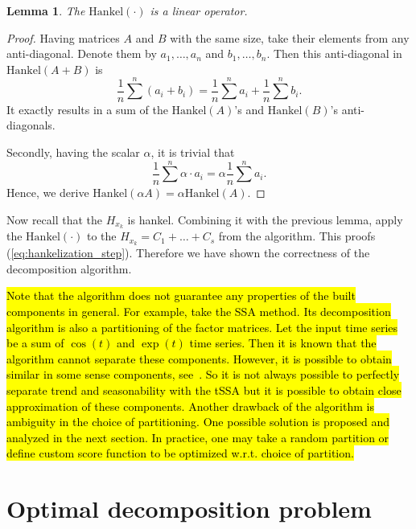 \documentclass[referee, pdflatex, sn-mathphys-num]{sn-jnl}
\theoremstyle{definition}
\theoremstyle{plain}
\newtheorem{Lem}{Lemma}
\begin{document}
	\begin{Lem}
		The $ \text{Hankel}(\cdot) $ is a linear operator.
	\end{Lem}
	
	\begin{proof}		
		Having matrices $ A $ and $ B $ with the same size, take their elements from any anti-diagonal. Denote them by $ a_1, \ldots, a_n $ and $ b_1, \ldots, b_n $. Then this anti-diagonal in $ \text{Hankel}(A + B) $ is \begin{equation*}
			 \dfrac{1}{n} \sum\limits^n (a_i + b_i) = \dfrac{1}{n} \sum\limits^n a_i + \dfrac{1}{n} \sum\limits^n b_i.
		\end{equation*}	It exactly results in a sum of the $ \text{Hankel}(A) $'s and $ \text{Hankel}(B) $'s anti-diagonals.
		
		Secondly, having the scalar $ \alpha $, it is trivial that \begin{equation*}
			 \dfrac{1}{n} \sum\limits^n \alpha \cdot a_i = \alpha \dfrac{1}{n} \sum\limits^n a_i.
		\end{equation*}	Hence, we derive $ \text{Hankel}(\alpha A) = \alpha \text{Hankel}(A) $.
	\end{proof}
	
	Now recall that the $ H_{x_k} $ is hankel. Combining it with the previous lemma, apply the $ \text{Hankel}(\cdot) $ to the $ H_{x_k} = C_1 + \ldots + C_s $ from the algorithm. This proofs (\ref{eq:hankelization_step}). Therefore we have shown the correctness of the decomposition algorithm.
	
	\hl{Note that the algorithm does not guarantee any properties of the built components in general. For example, take the SSA method. Its decomposition algorithm is also a partitioning of the factor matrices. Let the input time series be a sum of $\cos(t)$ and $\exp (t)$ time series. Then it is known that the algorithm cannot separate these components. However, it is possible to obtain similar in some sense components, see~{\cite{ecfb9dc578be43ae9ee8fc88b8ff9151}}. So it is not always possible to perfectly separate trend and seasonability with the tSSA but it is possible to obtain close approximation of these components. Another drawback of the algorithm is ambiguity in the choice of partitioning. One possible solution is proposed and analyzed in the next section. In practice, one may take a random partition or define custom score function to be optimized w.r.t. choice of partition.}
	
	\section{Optimal decomposition problem}\label{sec:optimal_decomp}
	
\end{document}

